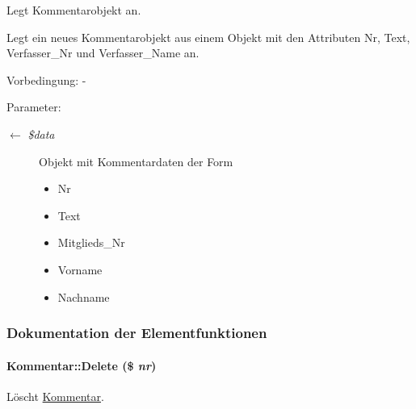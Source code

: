 Legt Kommentarobjekt an. 

Legt ein neues Kommentarobjekt aus einem Objekt mit den Attributen Nr, Text, Verfasser\_\-Nr und Verfasser\_\-Name an. \begin{Desc}
\item[Vorbedingung:]- \end{Desc}
\begin{Desc}
\item[Parameter:]
\begin{description}
\item[\mbox{$\leftarrow$} {\em \$data}]Objekt mit Kommentardaten der Form\begin{itemize}
\item Nr\item Text\item Mitglieds\_\-Nr\item Vorname\item Nachname \end{itemize}
\end{description}
\end{Desc}


\subsubsection{Dokumentation der Elementfunktionen}
\hypertarget{classKommentar_31c1fdfb4fb8f24e0016c8ddb98ddcdc}{
\paragraph[Delete]{\setlength{\rightskip}{0pt plus 5cm}Kommentar::Delete (\$ {\em nr})}\hfill}
\label{classKommentar_31c1fdfb4fb8f24e0016c8ddb98ddcdc}


Löscht \hyperlink{classKommentar}{Kommentar}. 

